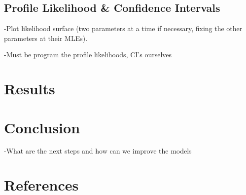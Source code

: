 \documentclass[11pt,preprint, authoryear]{elsarticle}
\numberwithin{equation}{section}
\numberwithin{figure}{section}
\numberwithin{table}{section}
\begin{document}
\subsection{Profile Likelihood \& Confidence
Intervals}\label{profile-likelihood-confidence-intervals}

-Plot likelihood surface (two parameters at a time if necessary, fixing
the other parameters at their MLEs).

-Must be program the profile likelihoods, CI's ourselves

\section{Results}\label{results}

\section{Conclusion}\label{conclusion}

-What are the next steps and how can we improve the models

\section{References}\label{references}

\newpage
\nocite{*}

\end{document}

